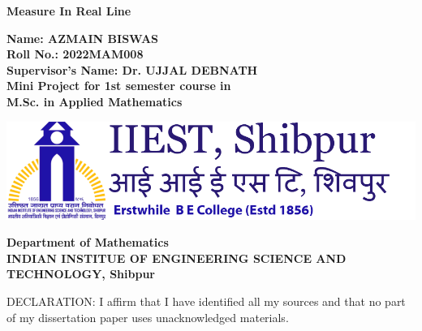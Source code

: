 \begin{titlepage}
    \begin{center}

        \vspace{2cm}

        \Huge{\textbf{Measure In Real Line}}

        \vspace{4cm}

        \Large\textbf{{
                Name: AZMAIN BISWAS\\
                Roll No.: 2022MAM008\\
                Supervisor's Name: Dr. UJJAL DEBNATH\\
                Mini Project for 1st semester course in\\
                M.Sc. in Applied Mathematics}}

        \vspace{2cm}

        \includegraphics[scale = 0.4]{pic/iiest.png}

        \vspace{2cm}

        \Large\textbf{{
                Department of Mathematics\\
                INDIAN INSTITUE OF ENGINEERING SCIENCE AND TECHNOLOGY, Shibpur}}

                \vspace{5cm}

        \large{DECLARATION: I affirm that I have identified all my sources and that no part of my dissertation paper uses unacknowledged materials.}
    \end{center}
\end{titlepage}
